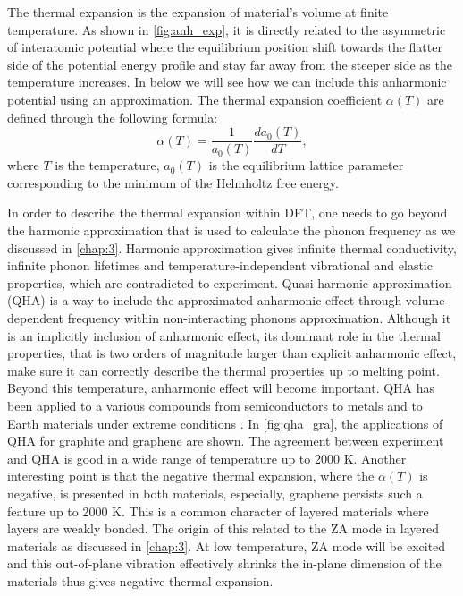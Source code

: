 The thermal expansion is the expansion of material's volume at finite temperature. As shown in \autoref{fig:anh_exp}, it is directly related to the asymmetric of interatomic potential where the equilibrium position shift towards the flatter side of the potential energy profile and stay far away from the steeper side as the temperature increases. In below we will see how we can include this anharmonic potential using an approximation. The thermal expansion coefficient $\alpha(T)$ are defined through the following formula: 
\begin{equation}
\alpha(T)=\frac{1}{a_0(T)}\frac{da_0(T)}{dT},
\end{equation}
where $T$ is the temperature, $a_0(T)$ is the equilibrium lattice parameter corresponding to the minimum of the Helmholtz free energy.

In order to describe the thermal expansion within DFT, one needs to go beyond the harmonic approximation that is used to calculate the phonon frequency as we discussed in \autoref{chap:3}. Harmonic approximation gives infinite thermal conductivity, infinite phonon lifetimes and temperature-independent vibrational and elastic properties, which are contradicted to experiment. Quasi-harmonic approximation (QHA)\cite{QHA1,QHA2,QHA3,Baroni39} is a way to include the approximated anharmonic effect through volume-dependent frequency within non-interacting phonons approximation. Although it is an implicitly inclusion of anharmonic effect, its dominant role in the thermal properties, that is two orders of magnitude larger than explicit anharmonic effect, make sure it can correctly describe the thermal properties up to melting point. Beyond this temperature, anharmonic effect will become important. QHA has been applied to a various compounds from semiconductors to metals and to Earth materials under extreme conditions\cite{QHA1,Grabowski2009,Karki2000} . In \autoref{fig:qha_gra}, the applications of QHA for graphite and graphene are shown. The agreement between experiment and QHA is good in a wide range of temperature up to 2000 K. Another interesting point is that the negative thermal expansion, where the $\alpha(T)$ is negative, is presented in both materials, especially, graphene persists such a feature up to 2000 K. This is a common character of layered materials where layers are weakly bonded. The origin of this related to the ZA mode in layered materials as discussed in \autoref{chap:3}. At low temperature, ZA mode will be excited and this out-of-plane vibration effectively shrinks the in-plane dimension of the materials thus gives negative thermal expansion.

